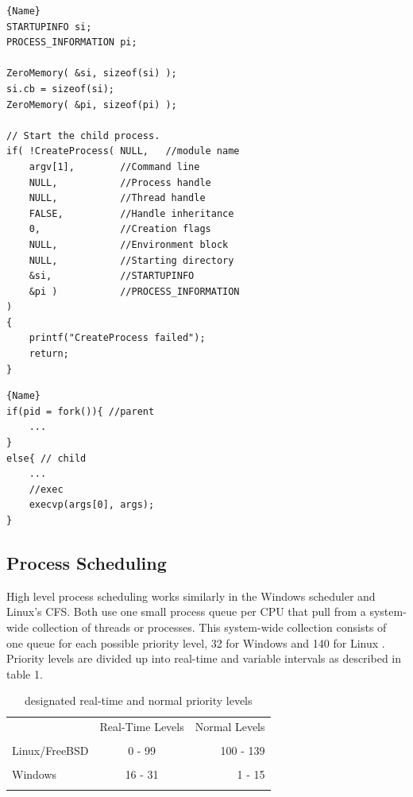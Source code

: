 \documentclass[10pt,draftclsnofoot,onecolumn]{article}
\begin{document}

\noindent\begin{minipage}{.48\textwidth}
	\begin{lstlisting}[caption=Creating a new process in Windows in user space~\cite{creating-processes},frame=tlrb]{Name}
STARTUPINFO si;
PROCESS_INFORMATION pi;

ZeroMemory( &si, sizeof(si) );
si.cb = sizeof(si);
ZeroMemory( &pi, sizeof(pi) );

// Start the child process. 
if( !CreateProcess( NULL,   //module name
    argv[1],        //Command line
    NULL,           //Process handle 
    NULL,           //Thread handle
    FALSE,          //Handle inheritance
    0,              //Creation flags
    NULL,           //Environment block
    NULL,           //Starting directory 
    &si,            //STARTUPINFO
    &pi )           //PROCESS_INFORMATION
) 
{
    printf("CreateProcess failed");
    return;
}
	\end{lstlisting}
\end{minipage}\hfill
\begin{minipage}{.45\textwidth}
	\begin{lstlisting}[caption=Creating a new process in Linux/BSD in user space,frame=tlrb]{Name}
if(pid = fork()){ //parent
	...
}
else{ // child
	...
	//exec
	execvp(args[0], args);
}
	\end{lstlisting}
\end{minipage}

\subsection{Process Scheduling}

High level process scheduling works similarly in the Windows scheduler and Linux’s CFS. Both use one small process queue per CPU that pull from a system-wide collection of threads or processes. This system-wide collection consists of one queue for each possible priority level, 32 for Windows and 140 for Linux \cite{Wandos}. Priority levels are divided up into real-time and variable intervals as described in table 1.\\

\begin{table}
	\centering
		\begin{tabular}{ | l | c | r | }
			\hline
			& Real-Time Levels & Normal Levels \\\\ \hline
			Linux/FreeBSD & 0 - 99 & 100 - 139 \\\\ \hline
			Windows & 16 - 31 & 1 - 15 \\\\ \hline
		\end{tabular}
		\caption{designated real-time and normal priority levels}
	\centering
\end{table}
\end{document}
